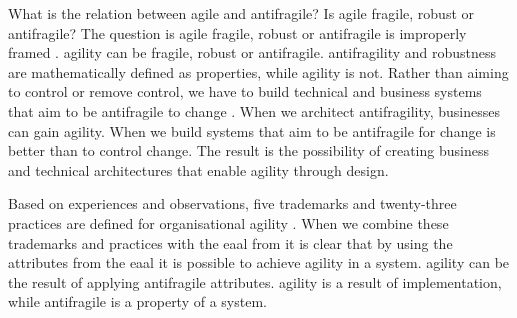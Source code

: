 What is the relation between \gls{agile} and \gls{antifragile}? Is \gls{agile} \gls{fragile}, \gls{robust} or \gls{antifragile}? The question is \gls{agile} \gls{fragile}, \gls{robust} or \gls{antifragile} is improperly framed \parencite[p.~6]{Tomov2019}. \Gls{agility} can be \gls{fragile}, \gls{robust} or \gls{antifragile}. \Gls{antifragility} and \gls{robustness} are mathematically defined as properties, while \gls{agility} is not. Rather than aiming to control or remove control, we have to build technical and business systems that aim to be \gls{antifragile} to change \parencite[Abstract]{OReilly2019}. When we architect \gls{antifragility}, businesses can gain \gls{agility}. When we build systems that aim to be \gls{antifragile} for change is better than to control change. The result is the possibility of creating business and technical architectures that enable \gls{agility} through design.

Based on experiences and observations, five trademarks and twenty-three practices are defined for organisational agility \parencite[p.~7]{Aghina2018}. When we combine these trademarks and practices with the \acrlong{eaal} from \textcite[p.~7]{Botjes2021} it is clear that by using the attributes from the \acrlong{eaal} it is possible to achieve \gls{agility} in a system. \Gls{agility} can be the result of applying \gls{antifragile} \glspl{attribute}. \Gls{agility} is a result of implementation, while \gls{antifragile} is a property of a system.

